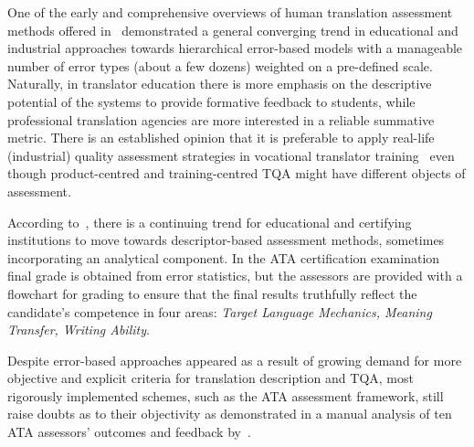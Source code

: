 One of the early and comprehensive overviews of human translation assessment methods offered in~\citet{Secara2005} demonstrated a general converging trend in educational and industrial approaches towards hierarchical error-based models with a manageable number of error types (about a few dozens) weighted on a pre-defined scale. Naturally, in translator education there is more emphasis on the descriptive potential of the systems to provide formative feedback to students, while professional translation agencies are more interested in a reliable summative metric. 
There is an established opinion that it is preferable to apply real-life (industrial) quality assessment strategies in vocational translator training~\cite{Doyle2003, Koby2005, Williams2013} even though product-centred and training-centred TQA might have different objects of assessment. 

According to~\citet{Hegrenaes2020}, there is a continuing trend for educational and certifying institutions to move towards descriptor-based assessment methods, sometimes incorporating an analytical component. In the \gls{ATA} certification examination final grade is obtained from error statistics, but the assessors are provided with a flowchart for grading to ensure that the final results truthfully reflect the candidate's competence in four areas: \textit{Target Language Mechanics, Meaning Transfer, Writing Ability}. 

Despite error-based approaches appeared as a result of growing demand for more objective and explicit criteria for translation description and TQA, most rigorously implemented schemes, such as the ATA assessment framework, still raise doubts as to their objectivity as demonstrated in a manual analysis of ten ATA assessors' outcomes and feedback by~\citet{Phelan2017}. 

